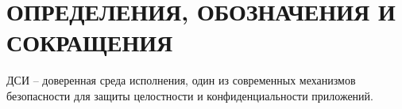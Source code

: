 \section*{ОПРЕДЕЛЕНИЯ, ОБОЗНАЧЕНИЯ И СОКРАЩЕНИЯ}

ДСИ -- доверенная среда исполнения, один из современных механизмов безопасности для защиты целостности и конфиденциальности приложений.
